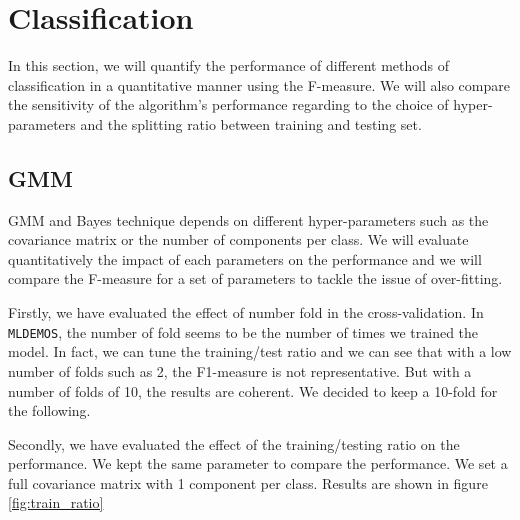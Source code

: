 \section{Classification}

In this section, we will quantify the performance of different methods of classification in a quantitative manner using the F-measure. We will also compare the sensitivity of the algorithm's performance regarding to the choice of hyper-parameters and the splitting ratio between training and testing set. 

\subsection{GMM}
GMM and Bayes technique depends on different hyper-parameters such as the covariance matrix or the number of components per class. We will evaluate quantitatively the impact of each parameters on the performance and we will compare the F-measure for a set of parameters to tackle the issue of over-fitting. 

Firstly, we have evaluated the effect of number fold in the cross-validation. In \texttt{MLDEMOS}, the number of fold seems to be the number of times we trained the model. In fact, we can tune the training/test ratio and we can see that with a low number of folds such as 2, the F1-measure is not representative. But with a number of folds of 10, the results are coherent. We decided to keep a 10-fold for the following.  

Secondly, we have evaluated the effect of the training/testing ratio on the performance. We kept the same parameter to compare the performance. We set a full covariance matrix with 1 component per class. Results are shown in figure \ref{fig:train_ratio}


